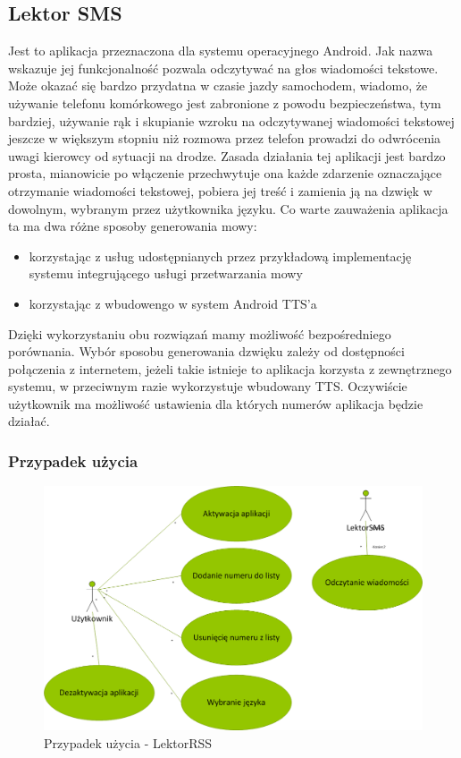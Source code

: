 \subsection{Lektor SMS}
Jest to aplikacja przeznaczona dla systemu operacyjnego Android. Jak nazwa wskazuje jej funkcjonalność pozwala odczytywać na głos wiadomości tekstowe. Może okazać się bardzo przydatna w czasie jazdy samochodem, wiadomo, że używanie telefonu komórkowego jest zabronione z powodu bezpieczeństwa, tym bardziej, używanie rąk i skupianie wzroku na odczytywanej wiadomości tekstowej jeszcze w większym stopniu niż rozmowa przez telefon prowadzi do odwrócenia uwagi kierowcy od sytuacji na drodze.
Zasada działania tej aplikacji jest bardzo prosta, mianowicie po włączenie przechwytuje ona każde zdarzenie oznaczające otrzymanie wiadomości tekstowej, pobiera jej treść i zamienia ją na dzwięk w dowolnym, wybranym przez użytkownika języku. Co warte zauważenia aplikacja ta ma dwa różne sposoby generowania mowy:
\begin{itemize}
	\item korzystając z usług udostępnianych przez przykładową implementację systemu integrującego usługi przetwarzania mowy
	\item korzystając z wbudowengo w system Android TTS'a
\end{itemize} 
Dzięki wykorzystaniu obu rozwiązań mamy możliwość bezpośredniego porównania. Wybór sposobu generowania dzwięku zależy od dostępności połączenia z internetem, jeżeli takie istnieje to aplikacja korzysta z zewnętrznego systemu, w przeciwnym razie wykorzystuje wbudowany TTS. Oczywiście użytkownik ma możliwość ustawienia dla których numerów aplikacja będzie działać.
\newpage
\subsubsection{Przypadek użycia}
\begin{figure}[!h]
	\centering
	\includegraphics[scale=0.45]{useCaseLektorSMS.png} 
	\caption{Przypadek użycia - LektorRSS}
\end{figure}

